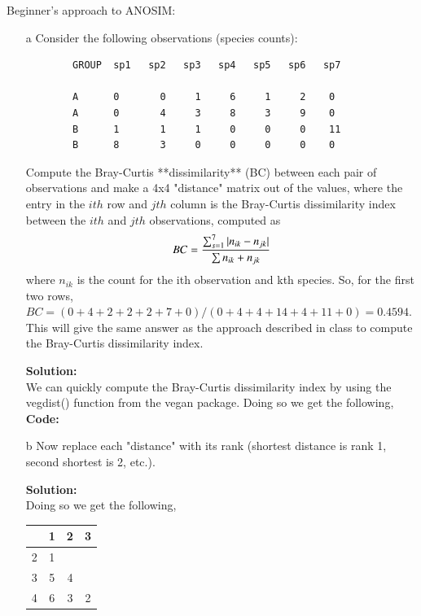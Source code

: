\documentclass[12pt]{article}
\makeatletter
\theoremstyle{homework}
\newenvironment{exercise}[1]
{\def\@currentlabel{#1}\exercisecore}
{\endexercisecore}
\newcommand{\localhead}[1]{\par\smallskip\noindent\textbf{#1}\nobreak\\}%
\newcommand\solution{\localhead{Solution:}}
\makeatother
\begin{document}
\begin{exercise}{2} Beginner's approach to ANOSIM:\\
  \begin{enumerate}
    \item[a] Consider the following observations (species counts):
    \begin{footnotesize}
      \begin{verbatim}
        GROUP  sp1   sp2   sp3   sp4   sp5   sp6   sp7
    
        A      0       0     1     6     1     2    0 
        A      0       4     3     8     3     9    0 
        B      1       1     1     0     0     0    11 
        B      8       3     0     0     0     0    0
      \end{verbatim}
      \end{footnotesize} 
      Compute the Bray-Curtis **dissimilarity** (BC) between each pair of observations and make
      a 4x4 "distance" matrix out of the values, where the entry in the $ith$ row and $jth$ column
      is the Bray-Curtis dissimilarity index between the $ith$ and $jth$ observations, computed as 
      \begin{equation*}
        BC = {{\sum_{s=1}^7 |n_{ik} - n_{jk}|}\over{\sum n_{ik} + n_{jk}}}
      \end{equation*}
      where $n_{ik}$ is the count for the ith observation and kth species. So, for the first two rows, 
      $BC = (0+4+2+2+2+7+0)/(0+4+4+14+4+11+0) = 0.4594$.  This will give the same answer as the approach 
      described in class to compute the Bray-Curtis dissimilarity index.\\
      \solution We can quickly compute the Bray-Curtis dissimilarity index by using the vegdist() function from the vegan package. 
      Doing so we get the following, \\
      \textbf{Code:}
      \begin{center}
      
      \end{center}
      \vspace{.15in}




      \item[b] Now replace each "distance" with its rank (shortest distance is
      rank 1, second shortest is 2, etc.).\\
      \solution  Doing so we get the following, 
      \begin{center}
        \begin{tabular}{c|c c c}
           & 1 & 2 & 3 \\
          \hline 
         2 & 1 &   &   \\
         3 & 5 & 4 &   \\
         4 & 6 & 3 & 2 \\
         \end{tabular}
        \end{center}
      \vspace{.15in}





\end{enumerate}
\end{exercise}
\end{document}
